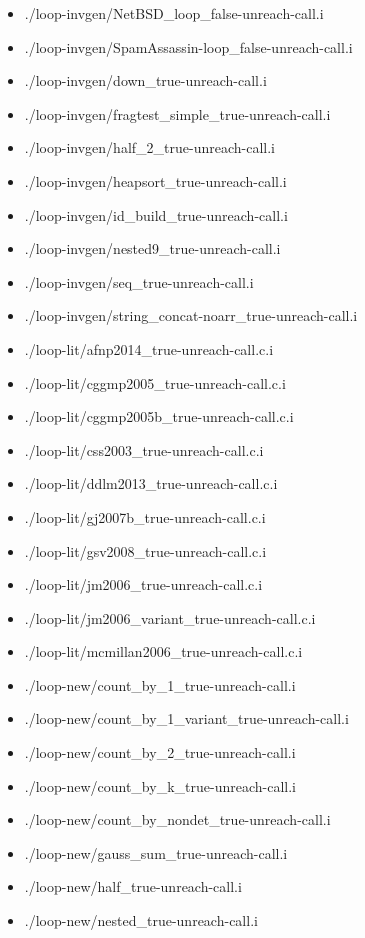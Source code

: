 \documentclass[envcountsame]{llncs}
\begin{document}
\begin{itemize}
\item ./loop-invgen/NetBSD\_loop\_false-unreach-call.i
\item ./loop-invgen/SpamAssassin-loop\_false-unreach-call.i
\item ./loop-invgen/down\_true-unreach-call.i
\item ./loop-invgen/fragtest\_simple\_true-unreach-call.i
\item ./loop-invgen/half\_2\_true-unreach-call.i
\item ./loop-invgen/heapsort\_true-unreach-call.i
\item ./loop-invgen/id\_build\_true-unreach-call.i
\item ./loop-invgen/nested9\_true-unreach-call.i
\item ./loop-invgen/seq\_true-unreach-call.i
\item ./loop-invgen/string\_concat-noarr\_true-unreach-call.i


\item ./loop-lit/afnp2014\_true-unreach-call.c.i
\item ./loop-lit/cggmp2005\_true-unreach-call.c.i
\item ./loop-lit/cggmp2005b\_true-unreach-call.c.i
\item ./loop-lit/css2003\_true-unreach-call.c.i
\item ./loop-lit/ddlm2013\_true-unreach-call.c.i
\item ./loop-lit/gj2007b\_true-unreach-call.c.i
\item ./loop-lit/gsv2008\_true-unreach-call.c.i
\item ./loop-lit/jm2006\_true-unreach-call.c.i
\item ./loop-lit/jm2006\_variant\_true-unreach-call.c.i
\item ./loop-lit/mcmillan2006\_true-unreach-call.c.i


\item ./loop-new/count\_by\_1\_true-unreach-call.i
\item ./loop-new/count\_by\_1\_variant\_true-unreach-call.i
\item ./loop-new/count\_by\_2\_true-unreach-call.i
\item ./loop-new/count\_by\_k\_true-unreach-call.i
\item ./loop-new/count\_by\_nondet\_true-unreach-call.i
\item ./loop-new/gauss\_sum\_true-unreach-call.i
\item ./loop-new/half\_true-unreach-call.i
\item ./loop-new/nested\_true-unreach-call.i



\end{itemize}
\end{document}
